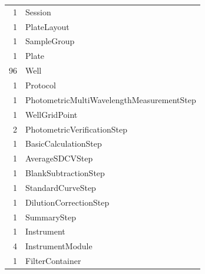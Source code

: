 \documentclass[UTF8,10pt,a4paper,fontset=fandol]{ctexart}
\newcommand{\fieldvalue}[1]{#1}
\begin{document}
\begin{tabular}{@{}rl@{}}
\fieldvalue{1} & Session\\
\fieldvalue{1} & PlateLayout\\
\fieldvalue{1} & SampleGroup\\
\fieldvalue{1} & Plate\\
\fieldvalue{96} & Well\\
\fieldvalue{1} & Protocol\\
\fieldvalue{1} & PhotometricMultiWavelengthMeasurementStep\\
\fieldvalue{1} & WellGridPoint\\
\fieldvalue{2} & PhotometricVerificationStep\\
\fieldvalue{1} & BasicCalculationStep\\
\fieldvalue{1} & AverageSDCVStep\\
\fieldvalue{1} & BlankSubtractionStep\\
\fieldvalue{1} & StandardCurveStep\\
\fieldvalue{1} & DilutionCorrectionStep\\
\fieldvalue{1} & SummaryStep\\
\fieldvalue{1} & Instrument\\
\fieldvalue{4} & InstrumentModule\\
\fieldvalue{1} & FilterContainer
\end{tabular}

\bigskip
\end{document}
